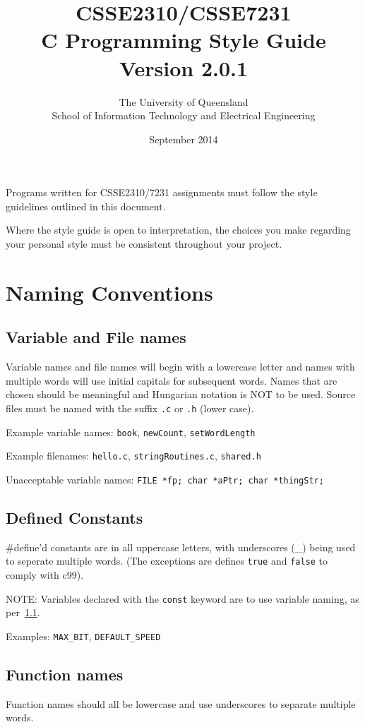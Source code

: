 \documentclass{article}
\title{CSSE2310/CSSE7231\\C Programming Style Guide\\Version 2.0.1}
\author{The University of Queensland\\School of Information Technology and Electrical Engineering}
\date{September 2014}
\begin{document}
\maketitle

Programs written for CSSE2310/7231 assignments must follow the style guidelines outlined in this document.

Where the style guide is open to interpretation, the choices you make regarding your personal style must be consistent throughout your project.

\section{Naming Conventions}
\subsection{Variable and File names}
\label{sec:naming-variable}
Variable names and file names will begin with a lowercase letter and names with multiple words will use initial capitals for subsequent words.
Names that are chosen should be meaningful and Hungarian notation is NOT to be used.
Source files must be named with the suffix \texttt{.c} or \texttt{.h} (lower case).

Example variable names: \texttt{book}, \texttt{newCount}, \texttt{setWordLength}

Example filenames: \texttt{hello.c}, \texttt{stringRoutines.c}, \texttt{shared.h}

Unacceptable variable names: \texttt{FILE *fp; char *aPtr; char *thingStr;}

\subsection{Defined Constants}
\label{sec:naming-constants}
\#define’d constants are in all uppercase letters, with underscores (\_) being used to seperate multiple words. (The exceptions are defines \texttt{true} and \texttt{false} to comply with c99).

NOTE: Variables declared with the \texttt{const} keyword are to use variable naming, as per~\ref{sec:naming-variable}.

Examples: \texttt{MAX\_BIT}, \texttt{DEFAULT\_SPEED}

\subsection{Function names}
Function names should all be lowercase and use underscores to separate multiple words.
\end{document}
